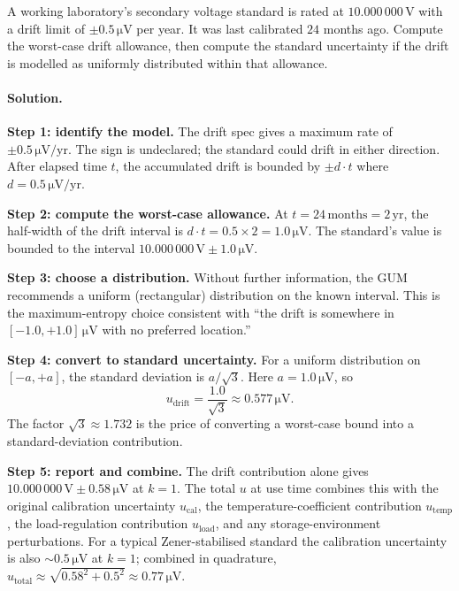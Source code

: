 \begin{exercise}
A working laboratory's secondary voltage standard is rated at
$10.000\,000 \,\si{\volt}$ with a drift limit of $\pm 0.5 \,\si
{\micro\volt}$ per year. It was last calibrated $24$ months ago.
Compute the worst-case drift allowance, then compute the standard
uncertainty if the drift is modelled as uniformly distributed
within that allowance.

\paragraph{Solution.}
\textbf{Step 1: identify the model.} The drift spec gives a
maximum rate of $\pm 0.5 \,\si{\micro\volt}/\text{yr}$. The sign
is undeclared; the standard could drift in either direction. After
elapsed time $t$, the accumulated drift is bounded by $\pm d \cdot
t$ where $d = 0.5 \,\si{\micro\volt}/\text{yr}$.

\textbf{Step 2: compute the worst-case allowance.} At $t = 24
\,\text{months} = 2 \,\text{yr}$, the half-width of the drift
interval is $d \cdot t = 0.5 \times 2 = 1.0 \,\si{\micro\volt}$.
The standard's value is bounded to the interval
$10.000\,000 \,\si{\volt} \pm 1.0 \,\si{\micro\volt}$.

\textbf{Step 3: choose a distribution.} Without further information,
the GUM recommends a uniform (rectangular) distribution on the
known interval. This is the maximum-entropy choice consistent with
``the drift is somewhere in $[-1.0, +1.0] \,\si{\micro\volt}$ with
no preferred location.''

\textbf{Step 4: convert to standard uncertainty.} For a uniform
distribution on $[-a, +a]$, the standard deviation is $a/\sqrt{3}$.
Here $a = 1.0 \,\si{\micro\volt}$, so
\[
u_{\text{drift}} = \frac{1.0}{\sqrt{3}} \approx 0.577 \,\si{\micro
\volt}.
\]
The factor $\sqrt{3} \approx 1.732$ is the price of converting a
worst-case bound into a standard-deviation contribution.

\textbf{Step 5: report and combine.} The drift contribution alone
gives $10.000\,000 \,\si{\volt} \pm 0.58 \,\si{\micro\volt}$ at
$k = 1$. The total $u$ at use time combines this with the original
calibration uncertainty $u_{\text{cal}}$, the temperature-coefficient
contribution $u_{\text{temp}}$, the load-regulation contribution
$u_{\text{load}}$, and any storage-environment perturbations. For
a typical Zener-stabilised standard the calibration uncertainty is
also $\sim 0.5 \,\si{\micro\volt}$ at $k = 1$; combined in
quadrature, $u_{\text{total}} \approx \sqrt{0.58^{2} + 0.5^{2}}
\approx 0.77 \,\si{\micro\volt}$.


\end{exercise}
